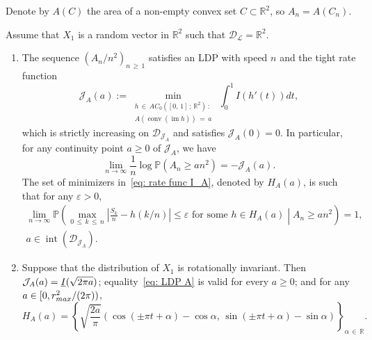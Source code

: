 \documentclass[AHL,Unicode,published]{cedram}
\DeclareMathOperator{\conv}{conv}
\DeclareMathOperator{\im}{im}
\DeclareMathOperator{\intr}{int}
\newcommand{\ubar}[1]{\underline{#1}}
\newcommand{\Rbb}{\mathbb{R}}
\newcommand{\Pbb}{\mathbb{P}}
\newcommand{\Dcl}{\mathcal{D}}
\newcommand{\Lcl}{\mathcal{L}}
\newcommand{\Jcl}{\mathcal{J}}
\begin{document}
Denote by $A(C)$ the area of a non-empty convex set $C \subset \Rbb^2$, so $A_n=A(C_n)$.

\goodbreak

\begin{theo}\label{thm: LD area}
Assume that $X_1$ is a random vector in $\Rbb^2$ such that $\Dcl_{\Lcl} = \Rbb^2$.
\begin{enumerate}
\item \label{theo2.11.1} The sequence $(A_n/n^2)_{n\,\ge\,1}$ satisfies an LDP with speed $n$ and the tight rate function
\begin{equation}\label{eq: rate func I_A}
\Jcl_A(a):=\min_{\substack{h\,\in\,AC_0\left([0,\,1]\,; \,\Rbb^2\right)\,: \\
A(\conv(\im h))\,=\,a }}\,\int_0^1 I(h'(t)) dt,
\end{equation}
which is strictly increasing on $\Dcl_{\Jcl_A}$ and satisfies $\Jcl_A(0)=0$. In particular, for any continuity point $a \ge 0$ of $\Jcl_A$, we have
\begin{equation}\label{eq: LDP A}
\lim_{n \to \infty} \frac 1n \log \Pbb\left(A_n \ge an^2\right) = -\Jcl_A(a).
\end{equation}
The set of minimizers in~\eqref{eq: rate func I_A}, denoted by $H_A(a)$, is such that for any $\varepsilon > 0$,
\begin{multline}\label{eq: A shape}
\lim_{n \to \infty} \Pbb \left(\max_{0\,\le\,k\,\le\,n} \left| \frac{S_k}{n} - h(k/n) \right| \le \varepsilon \text{ for some } h \in H_A(a) \middle| A_n \ge an^2 \right) = 1, \\
a \in \intr\left(\Dcl_{\Jcl_A}\right).
\end{multline}

\item \label{theo2.11.2}Suppose that the distribution of $X_1$ is rotationally invariant. Then $\Jcl_A(a)\linebreak=\ubar I (\sqrt{2 \pi a })$; equality~\eqref{eq: LDP A} is valid for every $a \ge 0$; and for any $a \in [0, r^2_{max}/\linebreak(2 \pi))$,
\begin{equation}\label{eq: A shape invar}
H_A(a)= \left\{ \sqrt{\frac{2a}{\pi }} \left(\cos (\pm \pi t + \alpha) - \cos \alpha, \, \sin (\pm \pi t + \alpha) - \sin \alpha \right) \right \}_{\alpha\,\in\,\Rbb}.
\end{equation}

\end{enumerate}
\end{theo}
\end{document}
